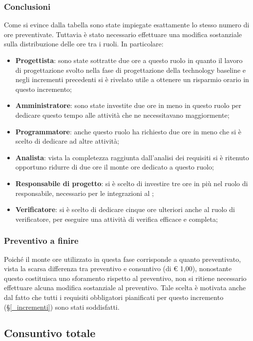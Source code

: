 \subsubsection{Conclusioni}
Come si evince dalla tabella sono state impiegate esattamente lo stesso numero di ore preventivate. Tuttavia è stato necessario effettuare una modifica sostanziale sulla distribuzione delle ore tra i ruoli. In particolare:
\begin{itemize}
	\item \textbf{Progettista}: sono state sottratte due ore a questo ruolo in quanto il lavoro di progettazione svolto nella fase di progettazione della technology baseline e negli incrementi precedenti si è rivelato utile a ottenere un risparmio orario in questo incremento;
	\item \textbf{Amministratore}: sono state investite due ore in meno in questo ruolo per dedicare questo tempo alle attività che ne necessitavano maggiormente;
	\item \textbf{Programmatore}: anche questo ruolo ha richiesto due ore in meno che si è scelto di dedicare ad altre attività;
	\item \textbf{Analista}: vista la completezza raggiunta dall'analisi dei requisiti si è ritenuto opportuno ridurre di due ore il monte ore dedicato a questo ruolo;
	\item \textbf{Responsabile di progetto}: si è scelto di investire tre ore in più nel ruolo di responsabile, necessario per le integrazioni al ;
	\item \textbf{Verificatore}: si è scelto di dedicare cinque ore ulteriori anche al ruolo di verificatore, per eseguire una attività di verifica efficace e completa;
\end{itemize} 

\subsubsection{Preventivo a finire}
Poiché il monte ore utilizzato in questa fase corrisponde a quanto preventivato, vista la scarsa differenza tra preventivo e consuntivo (di € 1,00), nonostante questo costituisca uno sforamento rispetto al preventivo, non si ritiene necessario effettuare alcuna modifica sostanziale al preventivo. Tale scelta è motivata anche dal fatto che tutti i requisiti obbligatori pianificati per questo incremento (\S\ref{_incrementi}) sono stati soddisfatti. 


\subsection{Consuntivo totale}\label{riepilogoPAF}

